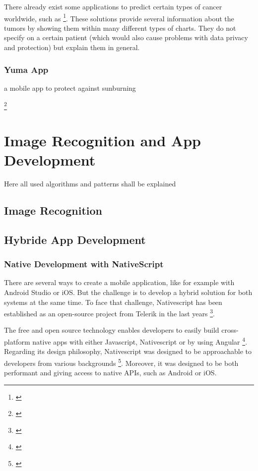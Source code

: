 There already exist some applications to predict certain types of cancer worldwide, such as \footnote{\cite{iarc_predict_cancer_worldwide}}. These solutions provide several information about the tumors by showing them within many different types of charts. They do not specify on a certain patient (which would also cause problems with data privacy and protection) but explain them in general.  

\subsection{Yuma App}
a mobile app to protect against sunburning

\footnote{\cite{vijini_gen_alg}}


\chapter{Image Recognition and App Development}
Here all used algorithms and patterns shall be explained

\section{Image Recognition}
\section{Hybride App Development}

\subsection{Native Development with NativeScript} 

There are several ways to create a mobile application, like for example with Android Studio or iOS. But the challenge is to develop a hybrid solution for both systems at the same time.
To face that challenge, Nativescript has been established as an open-source project from Telerik in the last years \footnote{\cite{nativescript}}. 

The free and open source technology enables developers to easily build cross-platform native apps with either Javascript, Nativescript or by using Angular \footnote{\cite{nativescript}}. 
Regarding its design philosophy, Nativescript was designed to be approachable to developers from various backgrounds \footnote{\cite{nativescript}}. Moreover, it was designed to be both performant and giving access to native APIs, such as Android or iOS.

